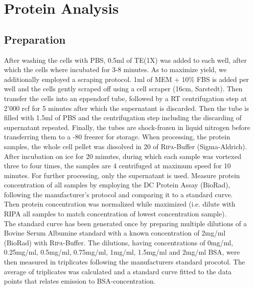 \section{Protein Analysis}
\subsection{Preparation}
After washing the cells with PBS, 0.5ml of TE(1X) was added to each well, after which the cells where incubated for 3-8 minutes. As to maximize yield, we additionally employed a scraping protocol. 1ml of MEM\textalpha{} + 10\% FBS is added per well and the cells gently scraped off using a cell scraper (16cm, Sarstedt). Then transfer the cells into an eppendorf tube, followed by a RT centrifugation step at 2'000 rcf for 5 minutes after which the supernatant is discarded. Then the tube is filled with 1.5ml of PBS and the centrifugation step including the discarding of supernatant repeated. Finally, the tubes are shock-frozen in liquid nitrogen before transferring them to a -80 \degC freezer for storage. When processing, the protein samples, the whole cell pellet was dissolved in 20\mul{} of \textsc{Ripa}-Buffer (Sigma-Aldrich). After incubation on ice for 20 minutes, during which each sample was vortexed three to four times, the samples are 4 \degC centrifuged at maximum speed for 10 minutes. For further processing, only the supernatant is used. Measure protein concentration of all samples by employing the DC\texttrademark{} Protein Assay (BioRad), following the manufacturer's protocol and comparing it to a standard curve. Then protein concentration was normalized while maximized (i.e. dilute with RIPA all samples to match concentration of lowest concentration sample). \\
The standard curve has been generated once by preparing multiple dilutions of a Bovine Serum Albumine standard with a known concentration of 2mg/ml (BioRad) with \textsc{Ripa}-Buffer. The dilutions, having concentrations of 0mg/ml, 0.25mg/ml, 0.5mg/ml, 0.75mg/ml, 1mg/ml, 1.5mg/ml and 2mg/ml BSA, were then measured in triplicates following the manufacturers standard procotol. The average of triplicates was calculated and a standard curve fitted to the data points that relates emission to BSA-concentration. 

